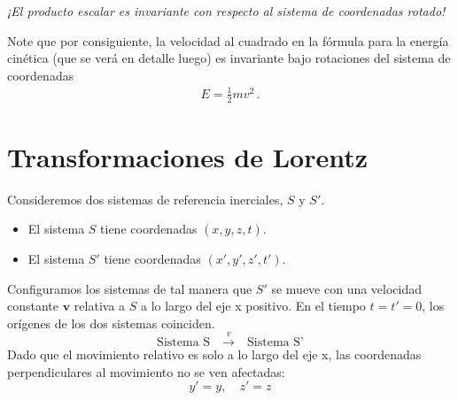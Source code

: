 \documentclass[11pt,a4paper]{article}
\begin{document}

\vspace{1em} %
\noindent %
\textit{¡El producto escalar es invariante con respecto al sistema de coordenadas rotado!}


Note que por consiguiente, la velocidad al cuadrado en la fórmula para la energía cinética (que se verá en detalle luego) es invariante bajo rotaciones del sistema de coordenadas
\begin{align*}
    E =\frac{1}{2}m v^2\,.
\end{align*}

\section{Transformaciones de Lorentz}

Consideremos dos sistemas de referencia inerciales, $S$ y $S'$.
\begin{itemize}
    \item El sistema $S$ tiene coordenadas $(x, y, z, t)$.
    \item El sistema $S'$ tiene coordenadas $(x', y', z', t')$.
\end{itemize}
Configuramos los sistemas de tal manera que $S'$ se mueve con una velocidad constante $\boldsymbol{v}$ relativa a $S$ a lo largo del eje x positivo. En el tiempo $t=t'=0$, los orígenes de los dos sistemas coinciden.
\[
\text{Sistema S} \quad \xrightarrow{v} \quad \text{Sistema S'}
\]
Dado que el movimiento relativo es solo a lo largo del eje x, las coordenadas perpendiculares al movimiento no se ven afectadas:
\[ y' = y, \quad z' = z \]
\end{document}

